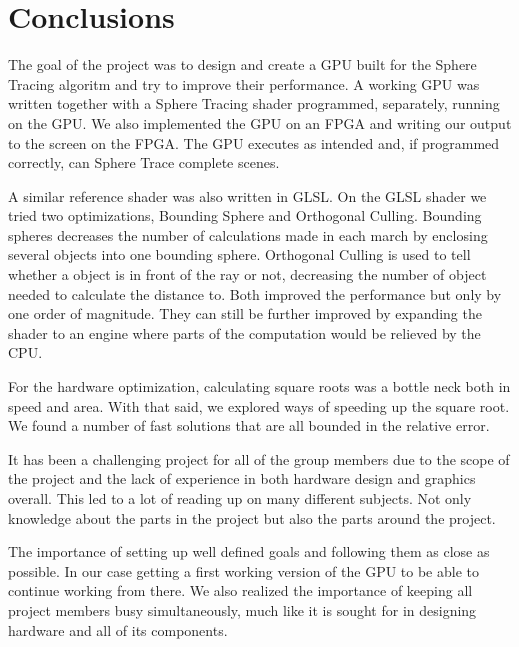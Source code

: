\chapter{Conclusions}

	The goal of the project was to design and create a GPU built for the
	Sphere Tracing algoritm and try to improve their performance. A
	working GPU was written together with a Sphere Tracing shader
	programmed, separately, running on the GPU. We also implemented the
	GPU on an FPGA and writing our output to the screen on the FPGA. The
	GPU executes as intended and, if programmed correctly, can Sphere
	Trace complete scenes.
	
	A similar reference shader was also written in GLSL. On the GLSL
	shader we tried two optimizations, Bounding Sphere and Orthogonal
	Culling. Bounding spheres decreases the number of calculations made
	in each march by enclosing several objects into one bounding sphere.
	Orthogonal Culling is used to tell whether a object is in front of
	the ray or not, decreasing the number of object needed to calculate
	the distance to. Both improved the performance but only by one order
	of magnitude. They can still be further improved by expanding the
	shader to an engine where parts of the computation would be relieved
	by the CPU.
	
	For the hardware optimization, calculating square roots was a bottle neck 
	both in	speed and area. With that said, we explored ways of speeding up the	
	square root. We found a number of fast solutions that are all bounded
	in the relative error.
	
	It has been a challenging project for all of the group members due to
	the scope of the project and the lack of experience in both hardware
	design and graphics overall. This led to a lot of reading up on many
	different subjects. Not only knowledge about the parts in the project but 
	also the parts around the project.

	The importance of setting up well defined goals and following them as
	close as possible. In our case getting a first working version of the
	GPU to be able to continue working from there. We also realized the importance 
	of keeping all project members busy simultaneously, much like it is sought for in
	designing hardware and all of its components.
